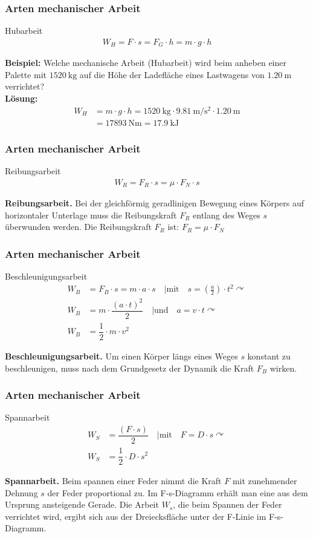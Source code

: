 \documentclass{beamer}
\begin{document}
\frame
{
  \frametitle{Arten mechanischer Arbeit}
  \begin{block}{Hubarbeit}
	\begin{align}
	W_H=F\cdot s=F_G\cdot h=m\cdot g\cdot h
	\end{align}
  \end{block}
  \textbf{Beispiel:} Welche mechanische Arbeit (Hubarbeit) wird beim anheben einer Palette mit $\SI{1520}{\kilo\gram}$ auf die Höhe der Ladefläche eines Lastwagens von $\SI{1,20}{\meter}$ verrichtet?\\
  \textbf{Lösung:}
  \begin{align*}
  W_H&=m\cdot g\cdot h=\SI{1520}{\kilo\gram}\cdot \SI{9,81}{\meter\per\square\second}\cdot \SI{1,20}{\meter}\\
  &=\SI{17893}{\newton\meter}=\SI{17,9}{\kilo\joule}
  \end{align*}
}

\frame
{
  \frametitle{Arten mechanischer Arbeit}
  \begin{block}{Reibungsarbeit}
	\begin{align}
	W_R=F_R\cdot s=\mu\cdot F_N\cdot s
	\end{align}
  \end{block}
  \textbf{Reibungsarbeit.} Bei der gleichförmig geradlinigen Bewegung eines Körpers auf horizontaler Unterlage muss die Reibungskraft $F_R$ entlang des Weges $s$ überwunden werden. Die Reibungskraft $F_R$ ist: $F_R=\mu\cdot F_N$
}

\frame
{
  \frametitle{Arten mechanischer Arbeit}
  \begin{block}{Beschleunigungsarbeit}
	\begin{align}
	W_B&=F_B\cdot s=m\cdot a\cdot s\quad | \text{mit}\quad s=\left(\frac{a}{2}\right)\cdot t^{2}\curvearrowright\\
	W_B&=m\cdot\dfrac{(a\cdot t)^{2}}{2}\quad | \text{und}\quad a=v\cdot t\curvearrowright\\
	W_B&=\dfrac{1}{2}\cdot m\cdot v^{2}
	\end{align}
  \end{block}
  \textbf{Beschleunigungsarbeit.} Um einen Körper längs eines Weges $s$ konstant zu beschleunigen, muss nach dem Grundgesetz der Dynamik die Kraft $F_B$ wirken.
}

\frame
{
  \frametitle{Arten mechanischer Arbeit}
  \begin{block}{Spannarbeit}
	\begin{align}
	W_S&=\dfrac{(F\cdot s)}{2}\quad | \text{mit}\quad F=D\cdot s\curvearrowright\\
	W_S&=\dfrac{1}{2}\cdot D\cdot s^{2}
	\end{align}
  \end{block}
  \textbf{Spannarbeit.} Beim spannen einer Feder nimmt die Kraft $F$ mit zunehmender Dehnung $s$ der Feder proportional zu. Im F-s-Diagramm erhält man eine aus dem Ursprung ansteigende Gerade. Die Arbeit $W_s$, die beim Spannen der Feder verrichtet wird, ergibt sich aus der Dreiecksfläche unter der F-Linie im F-s-Diagramm.
}
\end{document}
